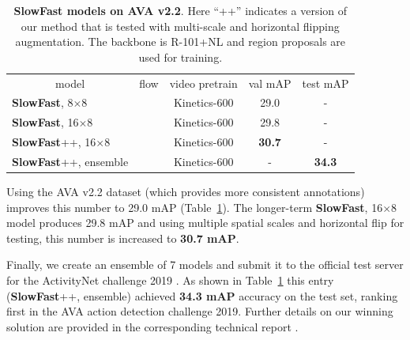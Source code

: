 \documentclass[10pt,twocolumn,letterpaper]{article}
\newcommand{\tblref}[1]{Table~\ref{#1}}
\def\x{$\times$}
\newcommand{\tablestyle}[2]{\setlength{\tabcolsep}{#1}\renewcommand{\arraystretch}{#2}\centering\footnotesize}
\begin{document}
	\begin{table}[t!]\vspace{-.8em}
		\centering
		\tablestyle{2.5pt}{1.05}
		\begin{tabular}{l|c|c|c|c}
			\multicolumn{1}{c|}{model} & flow &\multicolumn{1}{c|}{video pretrain} &   val mAP  & test mAP  \\ 
			\shline
			\textbf{SlowFast}, 8\x8 &  &Kinetics-{600}  & {29.0} & - \\
			\textbf{SlowFast}, 16\x8 & &Kinetics-{600}  & {29.8} & - \\
			\textbf{SlowFast}++, 16\x8 &  &Kinetics-{600}  & \textbf{30.7} & - \\
			\textbf{SlowFast}++, ensemble &  &  Kinetics-{600}  & - & \textbf{34.3}  \\
		\end{tabular}
		\vspace{.5em}
		\caption{\textbf{SlowFast models on AVA v2.2}.
			Here ``++'' indicates a version of our method that is tested with multi-scale and horizontal flipping augmentation. The backbone is R-101+NL and region proposals are used for training.
		}
		\label{tab:ava:challenge}
		\vspace{-1.2em}
	\end{table}
	
	

	Using the AVA v2.2 dataset (which provides more consistent annotations) improves this number to 29.0 mAP (\tblref{tab:ava:challenge}). The longer-term \textbf{SlowFast}, 16\x8 model produces 29.8 mAP and using multiple spatial scales and horizontal flip for testing, this number is increased to \textbf{30.7 mAP}.
	
	Finally, we create an ensemble of 7 models and submit it to the official test server for the ActivityNet challenge 2019 \cite{ActivityNet2019}. As shown in \tblref{tab:ava:challenge} this entry (\textbf{SlowFast}++, ensemble) achieved \textbf{34.3 mAP} accuracy on the test set, ranking first in the AVA action detection challenge 2019. Further details on our winning solution are provided in the corresponding technical report \cite{Feichtenhofer2019a}.
	
\end{document}

